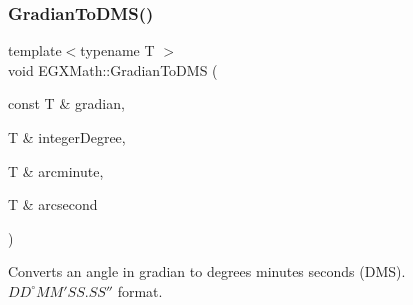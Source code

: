 \mbox{\label{group___e_g_x_math-_angle_conversions-_gradian_ga0b6700b55ab4a24fa581bf2af0dafdaa}} 
\subsubsection{\texorpdfstring{Gradian\+To\+D\+M\+S()}{GradianToDMS()}}
{\footnotesize\ttfamily template$<$typename T $>$ \\
void E\+G\+X\+Math\+::\+Gradian\+To\+D\+MS (\begin{DoxyParamCaption}\item[{const T \&}]{gradian,  }\item[{T \&}]{integer\+Degree,  }\item[{T \&}]{arcminute,  }\item[{T \&}]{arcsecond }\end{DoxyParamCaption})}



Converts an angle in gradian to degrees minutes seconds (D\+MS). ${DD}^{\circ}{MM}'{SS.SS}''$ format. 

